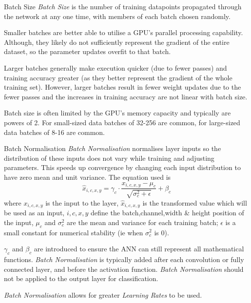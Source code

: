 \documentclass[11pt,a4paper]{article}
\begin{document}
  \begin{proposition}{Batch Size}
    \textit{Batch Size} is the number of training datapoints propagated through the network at any one time, with members of each batch chosen randomly.
    \par Smaller batches are better able to utilise a GPU's parallel processing capability. Although, they likely do not sufficiently represent the gradient of the entire dataset, so the parameter updates overfit to that batch.
    \par Larger batches generally make execution quicker (due to fewer passes) and training accuracy greater (as they better represent the gradient of the whole training set). However, larger batches result in fewer weight updates due to the fewer passes and the increases in training accuracy are not linear with batch size.
    \par Batch size is often limited by the GPU's memory capacity and typically are powers of 2. For small-sized data batches of 32-256 are common, for large-sized data batches of 8-16 are common.
  \end{proposition}

  \begin{definition}{Batch Normalisation}
    \textit{Batch Normalisation} normalises layer inputs so the distribution of these inputs does not vary while training and adjusting parameters. This speeds up convergence by changing each input distribution to have zero mean and unit variance. The equation used is
    \[ \hat{x}_{i,c,x,y}=\gamma_c\cdot\frac{x_{i,c,x,y}-\mu_c}{\sqrt{\sigma^2_c+\epsilon}}+\beta_c \]
    where $x_{i,c,x,y}$ is the input to the layer, $\hat{x}_{i,c,x,y}$ is the transformed value which will be used as an input, $i,c,x,y$ define the batch,channel,width \& height position of the input, $\mu_c$ and $\sigma^2_c$ are the mean and variance for each training batch; $\epsilon$ is a small constant for numerical stability (ie when $\sigma^2_c$ is 0).
    \par $\gamma_c$ and $\beta_c$ are introduced to ensure the ANN can still represent all mathematical functions.
    \textit{Batch Normalisation} is typically added after each convolution or fully connected layer, and before the activation function. \textit{Batch Normalisation} should not be applied to the output layer for classification.
    \par \textit{Batch Normalisation} allows for greater \textit{Learning Rates} to be used.
  \end{definition}
\end{document}
